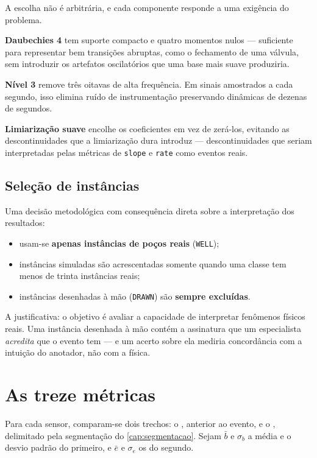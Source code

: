 \begin{destaque}
A escolha não é arbitrária, e cada componente responde a uma exigência do problema.

\textbf{Daubechies 4} tem suporte compacto e quatro momentos nulos --- suficiente para
representar bem transições abruptas, como o fechamento de uma válvula, sem introduzir os
artefatos oscilatórios que uma base mais suave produziria.

\textbf{Nível 3} remove três oitavas de alta frequência. Em sinais amostrados a cada
segundo, isso elimina ruído de instrumentação preservando dinâmicas de dezenas de
segundos.

\textbf{Limiarização suave} encolhe os coeficientes em vez de zerá-los, evitando as
descontinuidades que a limiarização dura introduz --- descontinuidades que seriam
interpretadas pelas métricas de \texttt{slope} e \texttt{rate} como eventos reais.
\end{destaque}

\subsection{Seleção de instâncias}

Uma decisão metodológica com consequência direta sobre a interpretação dos resultados:

\begin{itemize}[leftmargin=*,itemsep=0.3em]
  \item usam-se \textbf{apenas instâncias de poços reais} (\texttt{WELL});
  \item instâncias simuladas são acrescentadas somente quando uma classe tem menos de
        trinta instâncias reais;
  \item instâncias desenhadas à mão (\texttt{DRAWN}) são \textbf{sempre excluídas}.
\end{itemize}

A justificativa: o objetivo é avaliar a capacidade de interpretar fenômenos físicos
reais. Uma instância desenhada à mão contém a assinatura que um especialista
\emph{acredita} que o evento tem --- e um acerto sobre ela mediria concordância com a
intuição do anotador, não com a física.

\section{As treze métricas}

Para cada sensor, comparam-se dois trechos: o , anterior
ao evento, e o , delimitado pela segmentação do
\cref{cap:segmentacao}. Sejam $\bar{b}$ e $\sigma_b$ a média e o desvio padrão do
primeiro, e $\bar{e}$ e $\sigma_e$ os do segundo.

